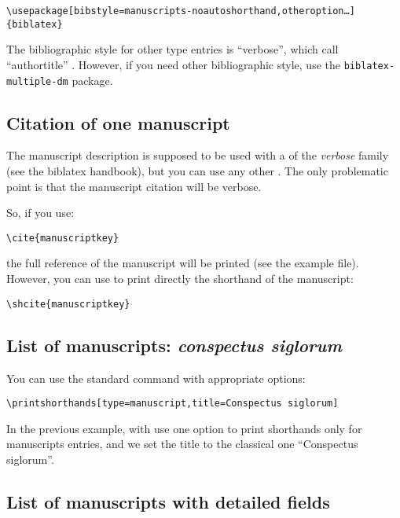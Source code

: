 \documentclass{ltxdockit}[2011/03/25]
\newcommand{\biblatex}{biblatex\xspace}
\begin{document}
\begin{verbatim}
\usepackage[bibstyle=manuscripts-noautoshorthand,otheroption…]{biblatex}
\end{verbatim}

The bibliographic style for other type entries is \enquote{verbose}, which call \enquote{authortitle} . However, if you need other bibliographic style, use the \verb+biblatex-multiple-dm+ package.

\subsection{Citation of one manuscript}

The manuscript description is supposed to be used with a  of the \emph{verbose} family (see the \biblatex handbook), but you can use any other . The only problematic point is that the manuscript citation will be verbose.

So, if you use:
\begin{verbatim}
\cite{manuscriptkey}
\end{verbatim}

the full reference of the manuscript will be printed (see the example file). However, you can use  to print directly the shorthand of the manuscript:

\begin{verbatim}
\shcite{manuscriptkey}
\end{verbatim}

\subsection{List of manuscripts: \emph{conspectus siglorum}}

You can use the standard command  with appropriate options:

\begin{verbatim}
\printshorthands[type=manuscript,title=Conspectus siglorum]
\end{verbatim}

In the previous example, with use one option to print shorthands only for manuscripts entries, and we set the title to the classical one \enquote{Conspectus siglorum}.

\subsection{List of manuscripts with detailed fields}
\end{document}
